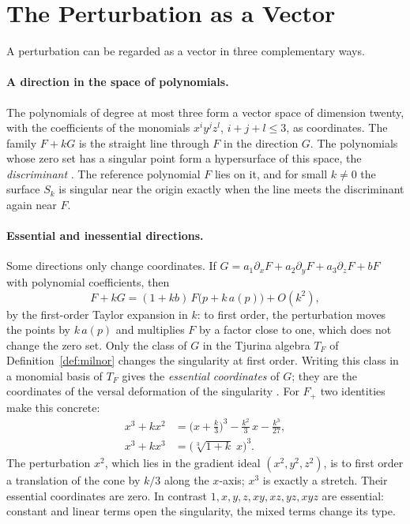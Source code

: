 \section{The Perturbation as a Vector}
\label{sec:vector}

A perturbation can be regarded as a vector in three complementary ways.

\paragraph{A direction in the space of polynomials.}
The polynomials of degree at most three form a vector space of dimension
twenty, with the coefficients of the monomials $x^iy^jz^l$, $i+j+l\le3$, as
coordinates. The family $F+kG$ is the straight line through $F$ in the
direction $G$. The polynomials whose zero set has a singular point form a
hypersurface of this space, the \emph{discriminant}
\cite{greuel2007introduction}. The reference polynomial $F$ lies on it, and
for small $k\neq0$ the surface $S_k$ is singular near the origin exactly when
the line meets the discriminant again near $F$.

\paragraph{Essential and inessential directions.}
Some directions only change coordinates. If
$G=a_1\partial_xF+a_2\partial_yF+a_3\partial_zF+bF$ with polynomial
coefficients, then
\[
F+kG=(1+kb)\,F\big(p+k\,a(p)\big)+O(k^2),
\]
by the first-order Taylor expansion in $k$: to first order, the perturbation
moves the points by $k\,a(p)$ and multiplies $F$ by a factor close to one,
which does not change the zero set. Only the class of $G$ in the Tjurina
algebra $T_F$ of Definition~\ref{def:milnor} changes the singularity at first
order. Writing this class in a monomial basis of $T_F$ gives the
\emph{essential coordinates} of $G$; they are the coordinates of the versal
deformation of the singularity \cite{greuel2007introduction,arnold2012singularities}.
For $F_+$ two identities make this concrete:
\begin{align}
\label{eq:translation}
x^3+kx^2&=\Big(x+\frac k3\Big)^3-\frac{k^2}{3}\,x-\frac{k^3}{27},\\
\label{eq:stretch}
x^3+kx^3&=\big(\sqrt[3]{1+k}\;x\big)^3 .
\end{align}
The perturbation $x^2$, which lies in the gradient ideal $(x^2,y^2,z^2)$, is
to first order a translation of the cone by $k/3$ along the $x$-axis; $x^3$
is exactly a stretch. Their essential coordinates are zero. In contrast
$1,x,y,z,xy,xz,yz,xyz$ are essential: constant and linear terms open the
singularity, the mixed terms change its type.

